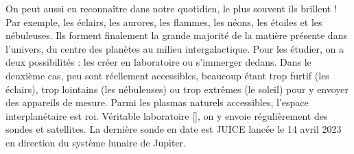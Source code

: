 On peut aussi en reconnaître dans notre quotidien, le plus souvent ils brillent ! Par exemple, les éclairs, les aurores, les flammes, les néons, les étoiles et les nébuleuses. Ils forment finalement la grande majorité de la matière présente dans l'univers, du centre des planètes au milieu intergalactique. Pour les étudier, on a deux possibilités : les créer en laboratoire ou s'immerger dedans. Dans le deuxième cas, peu sont réellement accessibles, beaucoup étant trop furtif (les éclairs), trop lointains (les nébuleuses) ou trop extrêmes (le soleil) pour y envoyer des appareils de mesure. Parmi les plasmas naturels accessibles, l'espace interplanétaire est roi. Véritable laboratoire [\cite{bruno_solar_2005}], on y envoie régulièrement des sondes et satellites. La dernière sonde en date est \ac{JUICE} lancée le 14 avril 2023 en direction du système lunaire de Jupiter. 

